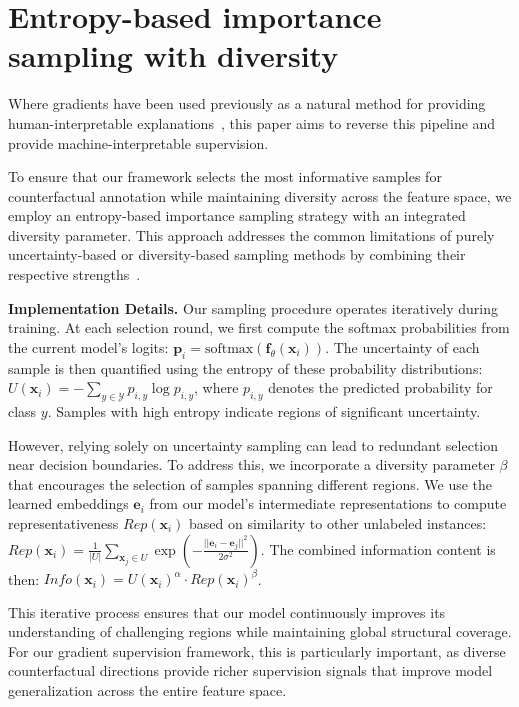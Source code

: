 \documentclass[sigconf,anonymous]{aamas}
\begin{document}
\balance




\appendix

\section{Entropy-based importance sampling with diversity}
Where gradients have been used previously as a natural method for providing human-interpretable explanations~\cite{simonyan2013deep}, this paper aims to reverse this pipeline and provide machine-interpretable supervision.

To ensure that our framework selects the most informative samples for counterfactual annotation while maintaining diversity across the feature space, we employ an entropy-based importance sampling strategy with an integrated diversity parameter. This approach addresses the common limitations of purely uncertainty-based or diversity-based sampling methods by combining their respective strengths~\cite{he2014active,doucet2024bridging}.

\textbf{Implementation Details.} Our sampling procedure operates iteratively during training. At each selection round, we first compute the softmax probabilities from the current model's logits: $\mathbf{p}_i = \text{softmax}(\mathbf{f}_\theta(\mathbf{x}_i))$. The uncertainty of each sample is then quantified using the entropy of these probability distributions: $U(\mathbf{x}_i) = -\sum_{y \in \mathcal{Y}} p_{i,y} \log p_{i,y}$, where $p_{i,y}$ denotes the predicted probability for class $y$. Samples with high entropy indicate regions of significant uncertainty.

However, relying solely on uncertainty sampling can lead to redundant selection near decision boundaries. To address this, we incorporate a diversity parameter $\beta$ that encourages the selection of samples spanning different regions. We use the learned embeddings $\mathbf{e}_i$ from our model's intermediate representations to compute representativeness $Rep(\mathbf{x}_i)$ based on similarity to other unlabeled instances: $Rep(\mathbf{x}_i) = \frac{1}{|U|} \sum_{\mathbf{x}_j \in U} \exp\left(-\frac{||\mathbf{e}_i - \mathbf{e}_j||^2}{2\sigma^2}\right)$. The combined information content is then: $Info(\mathbf{x}_i) = U(\mathbf{x}_i)^\alpha \cdot Rep(\mathbf{x}_i)^\beta$.

This iterative process ensures that our model continuously improves its understanding of challenging regions while maintaining global structural coverage. For our gradient supervision framework, this is particularly important, as diverse counterfactual directions provide richer supervision signals that improve model generalization across the entire feature space.
\end{document}
